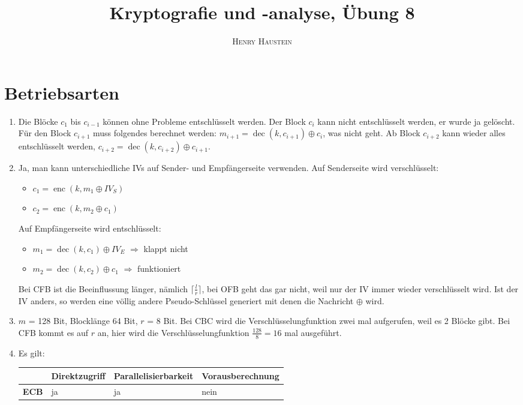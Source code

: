 \documentclass{article}
\title{\textbf{Kryptografie und -analyse, Übung 8}}
\author{\textsc{Henry Haustein}}
\date{}
\DeclareMathOperator{\dec}{dec}
\DeclareMathOperator{\enc}{enc}
\begin{document}
	\maketitle

	\section*{Betriebsarten}
	\begin{enumerate}[label=(\alph*)]
		\item Die Blöcke $c_1$ bis $c_{i-1}$ können ohne Probleme entschlüsselt werden. Der Block $c_i$ kann nicht entschlüsselt werden, er wurde ja gelöscht. Für den Block $c_{i+1}$ muss folgendes berechnet werden: $m_{i+1} = \dec(k, c_{i+1}) \oplus c_i$, was nicht geht. Ab Block $c_{i+2}$ kann wieder alles entschlüsselt werden, $c_{i+2} = \dec(k, c_{i+2}) \oplus c_{i+1}$.
		\item Ja, man kann unterschiedliche IVs auf Sender- und Empfängerseite verwenden. Auf Senderseite wird verschlüsselt:
		\begin{itemize}
			\item $c_1 = \enc(k, m_1 \oplus IV_S)$
			\item $c_2 = \enc(k, m_2 \oplus c_1)$
		\end{itemize}
		Auf Empfängerseite wird entschlüsselt:
		\begin{itemize}
			\item $m_1 = \dec(k, c_1) \oplus IV_E$ $\Rightarrow$ klappt nicht
			\item $m_2 = \dec(k, c_2) \oplus c_1$ $\Rightarrow$ funktioniert
		\end{itemize}
		Bei CFB ist die Beeinflussung länger, nämlich $\lceil\frac{l}{r}\rceil$, bei OFB geht das gar nicht, weil nur der IV immer wieder verschlüsselt wird. Ist der IV anders, so werden eine völlig andere Pseudo-Schlüssel generiert mit denen die Nachricht $\oplus$ wird.
		\item $m$ = 128 Bit, Blocklänge 64 Bit, $r$ = 8 Bit. Bei CBC wird die Verschlüsselungfunktion zwei mal aufgerufen, weil es 2 Blöcke gibt. Bei CFB kommt es auf $r$ an, hier wird die Verschlüsselungfunktion $\frac{128}{8} = 16$ mal ausgeführt.
		\item Es gilt:
		\begin{center}
			\begin{tabular}{L{2cm}|L{4cm}|L{4cm}|L{4cm}}
				& \textbf{Direktzugriff} & \textbf{Parallelisierbarkeit} & \textbf{Vorausberechnung} \\
				\hline
				\textbf{ECB} & ja & ja & nein \\

\end{tabular}
\end{center}
\end{enumerate}
\end{document}
